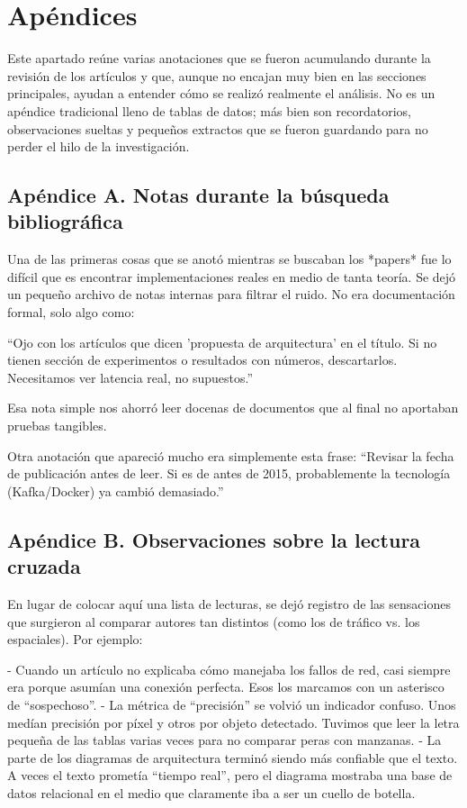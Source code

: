 \appendix
\section{Apéndices}

Este apartado reúne varias anotaciones que se fueron acumulando durante la revisión de los artículos y que, aunque no encajan muy bien en las secciones principales, ayudan a entender cómo se realizó realmente el análisis. No es un apéndice tradicional lleno de tablas de datos; más bien son recordatorios, observaciones sueltas y pequeños extractos que se fueron guardando para no perder el hilo de la investigación.

\subsection*{Apéndice A. Notas durante la búsqueda bibliográfica}

Una de las primeras cosas que se anotó mientras se buscaban los *papers* fue lo difícil que es encontrar implementaciones reales en medio de tanta teoría. Se dejó un pequeño archivo de notas internas para filtrar el ruido. No era documentación formal, solo algo como:

``Ojo con los artículos que dicen 'propuesta de arquitectura' en el título. Si no tienen sección de experimentos o resultados con números, descartarlos. Necesitamos ver latencia real, no supuestos.''

Esa nota simple nos ahorró leer docenas de documentos que al final no aportaban pruebas tangibles.

Otra anotación que apareció mucho era simplemente esta frase:  
``Revisar la fecha de publicación antes de leer. Si es de antes de 2015, probablemente la tecnología (Kafka/Docker) ya cambió demasiado.''

\subsection*{Apéndice B. Observaciones sobre la lectura cruzada}

En lugar de colocar aquí una lista de lecturas, se dejó registro de las sensaciones que surgieron al comparar autores tan distintos (como los de tráfico vs. los espaciales). Por ejemplo:

- Cuando un artículo no explicaba cómo manejaba los fallos de red, casi siempre era porque asumían una conexión perfecta. Esos los marcamos con un asterisco de ``sospechoso''.  
- La métrica de ``precisión'' se volvió un indicador confuso. Unos medían precisión por píxel y otros por objeto detectado. Tuvimos que leer la letra pequeña de las tablas varias veces para no comparar peras con manzanas.
- La parte de los diagramas de arquitectura terminó siendo más confiable que el texto. A veces el texto prometía ``tiempo real'', pero el diagrama mostraba una base de datos relacional en el medio que claramente iba a ser un cuello de botella.

